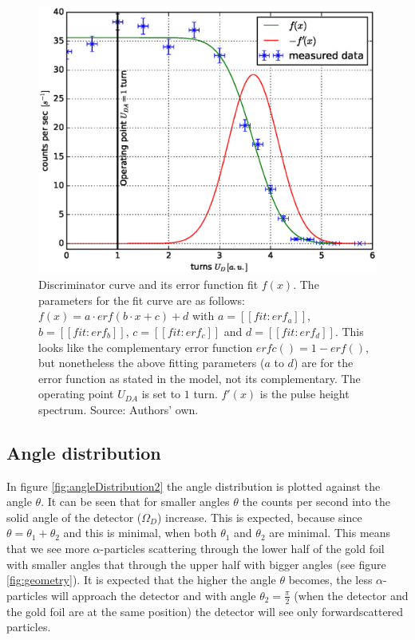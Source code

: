 \documentclass[a4paper]{article}
\begin{document}
\begin{figure}[H]
\centering
\includegraphics[width=1.0\textwidth]{plots/discriminator_curve.eps}
\caption{Discriminator curve and its error function fit $f(x)$. The parameters for the fit curve are as follows: $f(x) = a \cdot erf(b \cdot x + c) + d$ with $a = [[fit:erf_a]]$, $b = [[fit:erf_b]]$, $c = [[fit:erf_c]]$ and $d = [[fit:erf_d]]$. This looks like the complementary error function $erfc() = 1 - erf()$, but nonetheless the above fitting parameters ($a$ to $d$) are for the error function as stated in the model, not its complementary. The operating point $U_{DA}$ is set to $1$ turn. $f'(x)$ is the pulse height spectrum. Source: Authors' own.}
\label{fig:discriminatorCurve}
\end{figure}

\subsection{Angle distribution}

In figure \ref{fig:angleDistribution2} the angle distribution is plotted against the angle $\theta$. It can be seen that for smaller angles $\theta$ the counts per second into the solid angle of the detector ($\Omega_D$) increase. This is expected, because since $\theta = \theta_1 + \theta_2$ and this is minimal, when both $\theta_1$ and $\theta_2$ are minimal. This means that we see more $\alpha$-particles scattering through the lower half of the gold foil with smaller angles that through the upper half with bigger angles (see figure \ref{fig:geometry}). It is expected that the higher the angle $\theta$ becomes, the less $\alpha$-particles will approach the detector and with angle $\theta_2 = \frac{\pi}{2}$ (when the detector and the gold foil are at the same position) the detector will see only forwardscattered particles.
\end{document}
